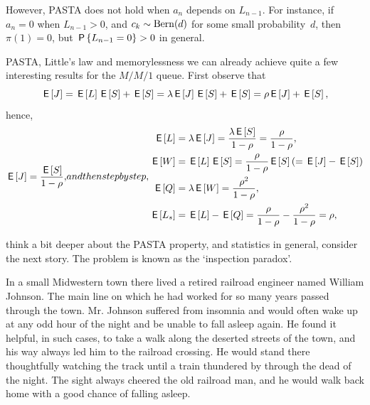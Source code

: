 \documentclass[queueing-book.tex]{subfiles}
\begin{document}
However, PASTA does not hold when $a_{n}$ depends on $L_{n-1}$. For instance, if $a_{n}=0$ when $L_{n-1}>0$, and $c_{k}\sim \Bern{d}$ for some small probability~$d$, then $\pi(1) = 0$, but $\P{L_{n-1}=0} > 0$ in general.


 PASTA, Little's law and memorylessness we can already achieve quite a few interesting results for the $M/M/1$ queue.
First observe that
\begin{equation*}
 \E\J = \E \L \E S + \E S = \lambda \E \J \E S + \E S= \rho \E \J + \E S,
\end{equation*}
hence,
\begin{subequations}
\begin{align}
 \E\J = \frac{\E S}{1-\rho},
\end{align}
and then step by step,
\begin{align}
 \E \L &= \lambda \E\J = \frac{\lambda \E S}{1-\rho} = \frac\rho{1-\rho}, \\
 \E{\W} &= \E L \E S = \frac{\rho}{1-\rho} \E S  (= \E J - \E S) \label{eq:wqes}\\
 \E{\QQ} &= \lambda \E{\W} = \frac{\rho^2}{1-\rho}, \\
 \E{\Ls} &= \E \L - \E{\QQ} = \frac{\rho}{1-\rho} - \frac{\rho^2}{1-\rho} = \rho,
\end{align}
\end{subequations}


 think a bit deeper about the PASTA property, and statistics in general, consider the next story.
The problem is known as the `inspection paradox'.

In a small Midwestern town there lived a retired railroad engineer named William
Johnson.
The main line on which he had worked for so many years passed through the
town. Mr. Johnson suffered from insomnia and would often wake up at any odd hour of
the night and be unable to fall asleep again. He found it helpful, in such cases, to take a
walk along the deserted streets of the town, and his way always led him to the railroad
crossing. He would stand there thoughtfully watching the track until a train thundered by
through the dead of the night. The sight always cheered the old railroad man, and he
would walk back home with a good chance of falling asleep.
\end{document}
